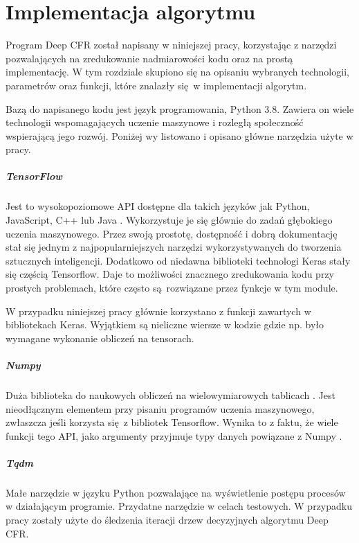 \documentclass[12pt,oneside,a4paper]{report}
\begin{document}
\chapter{Implementacja algorytmu} 

Program Deep CFR został napisany w niniejszej pracy, korzystając z narzędzi
pozwalających na zredukowanie nadmiarowości kodu oraz na prostą implementację.
W tym rozdziale skupiono się na opisaniu wybranych technologii, parametrów oraz funkcji, 
które znalazły się w implementacji algorytm.

Bazą do napisanego kodu jest język programowania, Python 3.8. Zawiera on wiele
technologii wspomagających uczenie maszynowe i rozległą społeczność wspierającą jego rozwój.
Poniżej 
wy listowano i opisano główne narzędzia użyte w pracy.

\paragraph{TensorFlow}

Jest to wysokopoziomowe API dostępne dla takich języków jak Python, JavaScript, C++ lub Java
\cite{tensorflow}.
Wykorzystuje je się głównie do zadań głębokiego uczenia maszynowego. Przez swoją prostotę, dostępność 
i dobrą
dokumentację stał się jednym z najpopularniejszych narzędzi wykorzystywanych do tworzenia
sztucznych inteligencji. Dodatkowo od niedawna biblioteki technologi Keras stały się częścią Tensorflow.
Daje to możliwości znacznego
zredukowania kodu przy prostych problemach, które często są rozwiązane przez fynkcje w tym module. 


W przypadku niniejszej pracy głównie korzystano z funkcji zawartych w bibliotekach Keras. Wyjątkiem 
są nieliczne wiersze w kodzie gdzie np. było wymagane wykonanie obliczeń na tensorach.

\paragraph{Numpy}

Duża biblioteka do naukowych obliczeń na wielowymiarowych tablicach \cite{numpy}. Jest nieodłącznym
elementem przy pisaniu programów uczenia maszynowego, zwłaszcza jeśli korzysta się z 
bibliotek Tensorflow. Wynika to z faktu, że wiele funkcji tego API, jako argumenty przyjmuje
typy danych powiązane z Numpy \cite{tensorflow}.



\paragraph{Tqdm}
Małe narzędzie w języku Python pozwalające na wyświetlenie postępu procesów w działającym 
programie.
Przydatne narzędzie w celach
testowych. W przypadku pracy zostały użyte do śledzenia iteracji drzew decyzyjnych 
algorytmu Deep CFR.
\end{document}
